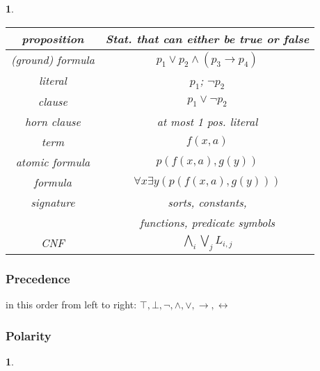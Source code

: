 \documentclass[]{article}
\newtheorem*{green}{}
\newtheorem*{blue}{}
\begin{document}
	
	
\begin{multicols}{3}
\begin{minipage}[t]{.31\textwidth}

\begin{green}
\begin{tabular}{c|c}
	proposition & Stat. that can either be true or false\\
	\hline
	(ground) formula & $p_1 \lor p_2 \land (p_3 \rightarrow p_4)$ \\
	\hline
	literal & $p_1$; $\lnot p_2$ \\
	\hline
	clause & $p_1 \lor \lnot p_2$ \\
	\hline
	horn clause & at most 1 pos. literal \\
	\hline
	term & $f(x,a)$ \\
	\hline
	atomic formula & $p(f(x,a), g(y))$ \\
	\hline
	formula & $\forall x \exists y (p(f(x,a), g(y)))$ \\
	\hline
	signature & sorts, constants,\\
	& functions, predicate symbols \\
	\hline
	CNF & $\bigwedge_i \bigvee_j L_{i,j}$\\
\end{tabular}
\end{green}

\subsubsection*{Precedence}
in this order from left to right: $\top, \bot, \lnot, \land, \lor, \rightarrow, \leftrightarrow$

\subsubsection*{Polarity}
\begin{blue}
\end{blue}
\end{minipage}
\end{multicols}
\end{document}
